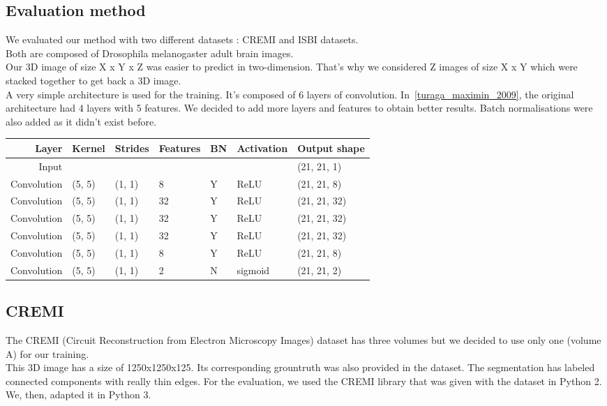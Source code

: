 \subsection{Evaluation method}
We evaluated our method with two different datasets : CREMI and ISBI datasets.\\
Both are composed of Drosophila melanogaster adult brain images.\\

Our 3D image of size X x Y x Z was easier to predict in two-dimension. 
That's why we considered Z images of size X x Y which were stacked together to get back a 3D image.\\
A very simple architecture is used for the training.
It's composed of 6 layers of convolution.
In~\ref{turaga_maximin_2009}, the original architecture had 4 layers with 5 features. We decided to add more layers and features to obtain better results. 
Batch normalisations were also added as it didn't exist before.
\begin{center}
	\begin{tabular}{rllllll}\toprule
		Layer & Kernel & Strides & Features & BN &  Activation & Output shape \\
		\midrule
		Input  &  &  & & & & (21, 21, 1)  \\
		Convolution & (5, 5) & (1, 1) & 8 & Y & ReLU  & (21, 21, 8)  \\
		Convolution & (5, 5) & (1, 1) & 32 & Y & ReLU  & (21, 21, 32)  \\
		Convolution & (5, 5) & (1, 1) & 32 & Y & ReLU  & (21, 21, 32)  \\
		Convolution & (5, 5) & (1, 1) & 32 & Y & ReLU  & (21, 21, 32)  \\
		Convolution & (5, 5) & (1, 1) & 8 & Y & ReLU  & (21, 21, 8)  \\
		Convolution & (5, 5) & (1, 1) & 2 & N & sigmoid  & (21, 21, 2)  \\
		\bottomrule
	\end{tabular}
\end{center}

\subsection{CREMI}
The CREMI (Circuit Reconstruction from Electron Microscopy Images) dataset has three volumes but we decided to use only one (volume A) for our training.\\
This 3D image has a size of 1250x1250x125. Its corresponding grountruth was also provided in the dataset. 
The segmentation has labeled connected components with really thin edges.
For the evaluation, we used the CREMI library that was given with the dataset in Python 2. We, then, adapted it in Python 3.\\




